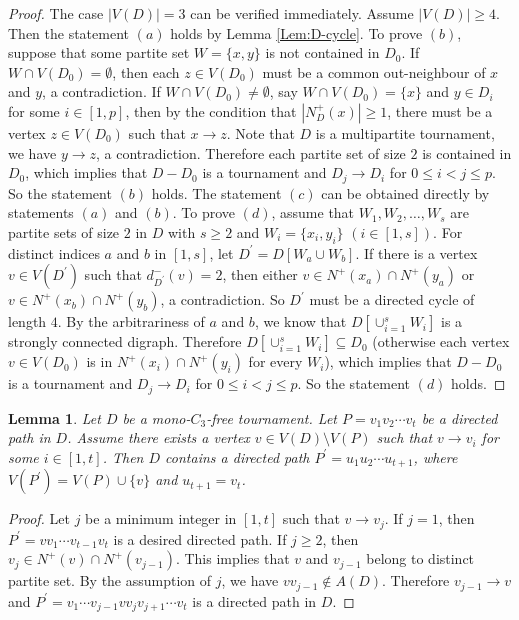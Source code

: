 \documentclass[11pt,a4paper]{article}
\newtheorem{lemma}{Lemma}
\theoremstyle{definition}
\begin{document}
\begin{proof}
    The case $|V(D)|=3$ can be verified immediately. Assume $|V(D)|\geq 4$. Then the statement $(a)$ holds by Lemma \ref{Lem:D-cycle}. To prove $(b)$, suppose that some partite set  $W=\{x,y\}$ is not contained in $D_0$. If $W\cap V(D_0)=\emptyset$, then each $z\in V(D_0)$ must be a common out-neighbour of $x$ and $y$, a contradiction. If $W\cap V(D_0)\neq \emptyset$, say $W\cap V(D_0)=\{x\}$ and $y\in D_i$ for some $i\in[1,p]$, then by the condition that $|N^+_D(x)|\geq 1$, there must be a vertex $z\in V(D_0)$ such that $x\rightarrow z$. Note that $D$ is a multipartite tournament, we have $y\rightarrow z$, a contradiction. Therefore each partite set of size $2$ is contained in $D_0$, which implies that $D-D_0$ is a tournament and $D_j\rightarrow D_i$ for $0\leq i<j\leq p$. So the statement $(b)$ holds. The statement $(c)$ can be obtained directly by statements $(a)$ and $(b)$.   To prove $(d)$, assume that  $W_1,W_2,\ldots,W_s$ are partite sets of size $2$ in $D$ with $s\geq2$ and  $W_i=\{x_i, y_i\}$ $(i\in[1,s])$. For distinct indices $a$ and $b$ in $[1,s]$, let $D^\prime=D[W_a\cup W_b]$. If there is a vertex  $v\in V(D^{\prime})$ such that $d^-_{D^{\prime}}(v)=2$, then either $v\in N^+(x_a) \cap N^+(y_a)$ or $v\in N^+(x_b) \cap N^+(y_b)$, a contradiction. So $D^{\prime}$ must be a directed cycle of length $4$. By the arbitrariness of $a$ and $b$,  we know that $D[\cup^s_{i=1}W_i]$ is a strongly connected digraph.  Therefore $D[\cup^s_{i=1}W_i]\subseteq D_0$ (otherwise each vertex $v\in V(D_0)$ is in $ N^+(x_i) \cap N^+(y_i)$ for every $W_i$),  which implies that $D-D_0$ is a tournament and $D_j\rightarrow D_i$ for $0\leq i<j\leq p$.  So the statement $(d)$ holds.
\end{proof}
\begin{lemma}\label{Lem:D-path}
    Let $D$ be a mono-$C_3$-free tournament. Let  ${P}=v_1v_2\cdots v_t $ be a directed path in $D$. Assume  there exists  a vertex $v\in V(D)\setminus V({P})$  such that   $v\rightarrow v_i$ for some $i\in[1, t]$.  Then $D$ contains a directed path ${P^{\prime}  }=u_1u_2\cdots u_{t+1}$,  where $V({P^{\prime}  })=V({P})\cup\{v \}$ and  $u_{t+1}=v_t$.
\end{lemma}
    \begin{proof}
        Let $j$ be a minimum integer in $[1,t]$ such that $v\rightarrow v_j$. If $j=1$, then ${P^{\prime}  }=vv_1\cdots v_{t-1}v_t$ is a desired directed path. If $j\geq 2$, then
        $v_j\in N^+(v)\cap N^+(v_{j-1})$. This implies that $v$ and $v_{j-1}$ belong to distinct partite set. By the assumption of $j$, we have $vv_{j-1}\not\in A(D)$. Therefore $v_{j-1}\rightarrow v$ and ${P^{\prime}  }=v_1 \cdots v_{j-1}vv_jv_{j+1}\cdots v_t$ is a directed path in $D$.
    \end{proof}
\end{document}
